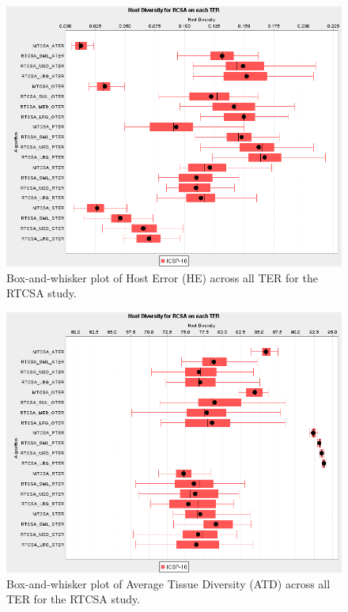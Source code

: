 \begin{figure}[htp]
	\centering
		\includegraphics[scale=0.65]{Tissues/RTCSA-HE}
	\caption{Box-and-whisker plot of Host Error (HE) across all TER for the RTCSA study.}
	\label{fig:tissues:rtcsa:he:boxplot}
\end{figure}

\begin{figure}[htp]
	\centering
		\includegraphics[scale=0.65]{Tissues/RTCSA-ATD}
	\caption{Box-and-whisker plot of Average Tissue Diversity (ATD) across all TER for the RTCSA study.}
	\label{fig:tissues:rtcsa:atd:boxplot}
\end{figure}


